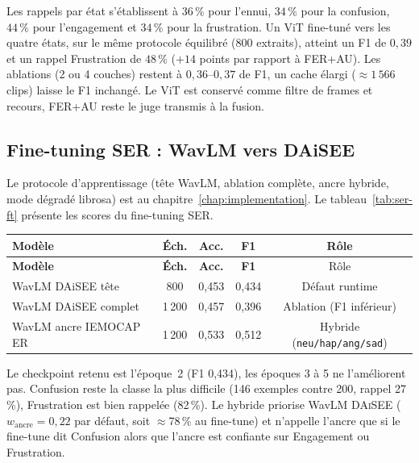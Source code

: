 Les rappels par état s'établissent à $36\,\%$ pour l'ennui, $34\,\%$ pour
la confusion, $44\,\%$ pour l'engagement et $34\,\%$ pour la frustration.
Un ViT fine-tuné vers les quatre états, sur le même protocole équilibré
(800 extraits), atteint un F1 de $0{,}39$ et un rappel Frustration de
$48\,\%$ ($+14$ points par rapport à FER+AU). Les ablations (2 ou 4
couches) restent à $0{,}36$--$0{,}37$ de F1, un cache élargi
($\approx 1\,566$ clips) laisse le F1 inchangé. Le ViT est conservé
comme filtre de frames et recours, FER+AU reste le juge transmis à la
fusion.

\subsection{Fine-tuning SER : WavLM vers DAiSEE}
\label{subsec:val-ser}

Le protocole d'apprentissage (tête WavLM, ablation complète, ancre
hybride, mode dégradé librosa) est au chapitre~\ref{chap:implementation}.
Le tableau~\ref{tab:ser-ft} présente les scores du fine-tuning SER.

{\small
\renewcommand{\arraystretch}{1.18}
\setlength{\tabcolsep}{4pt}
\begin{xltabular}{\textwidth}{|>{\raggedright\arraybackslash}X|c|c|c|c|}
\hline
{}
\textbf{Modèle} & \textbf{Éch.} & \textbf{Acc.} & \textbf{F1} &
Rôle \\
\hline
\endfirsthead
\hline
{}
\textbf{Modèle} & \textbf{Éch.} & \textbf{Acc.} & \textbf{F1} &
Rôle \\
\hline
\endhead
\endfoot
\endlastfoot
WavLM DAiSEE tête & 800 & 0{,}453 & 0{,}434 &
Défaut runtime \\
\hline
WavLM DAiSEE complet & 1\,200 & 0{,}457 & 0{,}396 & Ablation (F1
inférieur) \\
\hline
WavLM ancre IEMOCAP ER & 1\,200 & 0{,}533 & 0{,}512 & Hybride
(\texttt{neu/hap/ang/sad}) \\
\hline
\end{xltabular}
\label{tab:ser-ft}
}


Le checkpoint retenu est l'époque~2 (F1 0{,}434), les époques 3 à 5 ne
l'améliorent pas. Confusion reste la
classe la plus difficile (146 exemples contre 200, rappel 27\,\%), 
Frustration est bien rappelée (82\,\%). Le hybride priorise WavLM
\textsc{DAiSEE} ($w_{\mathrm{ancre}}=0{,}22$ par défaut, soit
$\approx$78\,\% au fine-tune) et n'appelle l'ancre que si le
fine-tune dit Confusion alors que l'ancre est confiante sur Engagement
ou Frustration.

